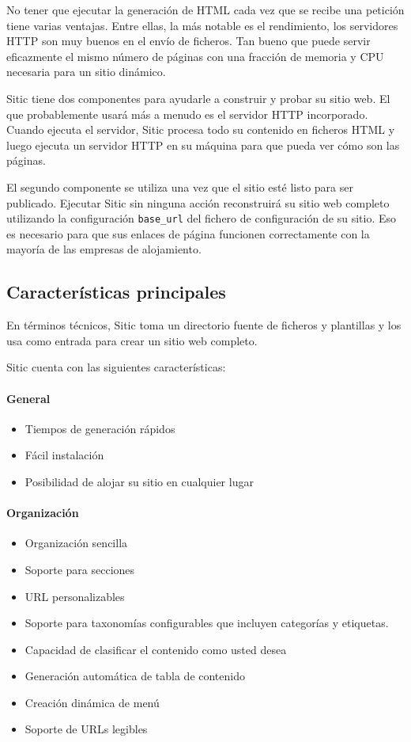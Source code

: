 No tener que ejecutar la generación de HTML cada vez que se recibe una petición tiene varias ventajas. Entre ellas,
la más notable es el rendimiento, los servidores HTTP son muy buenos en el envío de ficheros. Tan bueno que puede
servir eficazmente el mismo número de páginas con una fracción de memoria y CPU necesaria para un sitio dinámico.

Sitic tiene dos componentes para ayudarle a construir y probar su sitio web. El que probablemente usará más a menudo es el
servidor HTTP incorporado. Cuando ejecuta el servidor, Sitic procesa todo su contenido en ficheros HTML y luego ejecuta
un servidor HTTP en su máquina para que pueda ver cómo son las páginas.

El segundo componente se utiliza una vez que el sitio esté listo para ser publicado.
Ejecutar Sitic sin ninguna acción reconstruirá su sitio web completo utilizando la configuración \texttt{base\_url} 
del fichero de configuración de su sitio. Eso es necesario para que sus enlaces de página funcionen correctamente 
con la mayoría de las empresas de alojamiento.

\subsection{Características principales}

En términos técnicos, Sitic toma un directorio fuente de ficheros 
y plantillas y los usa como entrada para crear un sitio web completo.

Sitic cuenta con las siguientes características:

\paragraph{General}

\begin{itemize}
\item Tiempos de generación rápidos
\item Fácil instalación
\item Posibilidad de alojar su sitio en cualquier lugar
\end{itemize}

\paragraph{Organización}

\begin{itemize}
\item Organización sencilla
\item Soporte para secciones
\item URL personalizables
\item Soporte para taxonomías configurables que incluyen categorías y etiquetas.
\item Capacidad de clasificar el contenido como usted desea
\item Generación automática de tabla de contenido
\item Creación dinámica de menú
\item Soporte de URLs legibles
\end{itemize}


